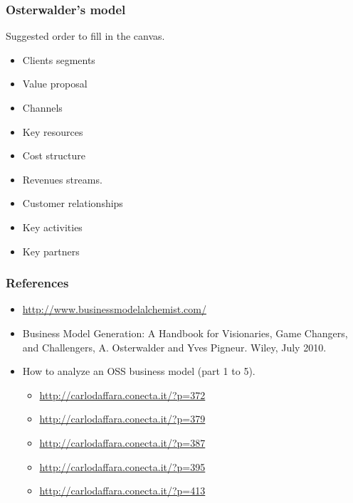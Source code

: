 \begin{frame}
\frametitle{Osterwalder's model}
Suggested order to fill in the canvas.
\begin{itemize}
 \item Clients segments
 \item Value proposal
 \item Channels
 \item Key resources
 \item Cost structure
 \item Revenues streams.
 \item Customer relationships
 \item Key activities
 \item Key partners
\end{itemize}

\end{frame}

\begin{frame}
 \frametitle{References}
\begin{itemize}
 \item \url{http://www.businessmodelalchemist.com/} 
 \item Business Model Generation: A Handbook for Visionaries, Game Changers, and Challengers, A. Osterwalder and Yves Pigneur. Wiley, July 2010.
 \item How to analyze an OSS business model (part 1 to 5).
  \begin{itemize}
   \item \url{http://carlodaffara.conecta.it/?p=372}
   \item \url{http://carlodaffara.conecta.it/?p=379}
   \item \url{http://carlodaffara.conecta.it/?p=387}
   \item \url{http://carlodaffara.conecta.it/?p=395}
   \item \url{http://carlodaffara.conecta.it/?p=413}
  \end{itemize}

\end{itemize}

  
 
 

\end{frame}

